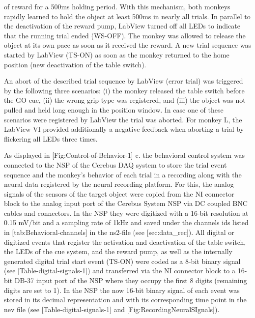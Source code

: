 {of reward for a 500ms holding period. With this mechanism, both monkeys rapidly learned to hold the object at least 500ms in nearly all trials. In parallel to the deactivation of the reward pump, LabView turned off all LEDs to indicate that the running trial ended (WS-OFF). The monkey was allowed to release the object at its own pace as soon as it received the reward. A new trial sequence was started by LabView (TS-ON) as soon as the monkey returned to the home position (new deactivation of the table switch).

An abort of the described trial sequence by LabView (error trial) was triggered by the following three scenarios: (i) the monkey released the table switch before the GO cue, (ii) the wrong grip type was registered, and (iii) the object was not pulled and held long enough in the position window. In case one of these scenarios were registered by LabView the trial was aborted. For monkey L, the LabView VI provided additionally a negative feedback when aborting a trial by flickering all LEDs three times. 

As displayed in [Fig:Control-of-Behavior-1] c. the behavioral control system was connected to the NSP of the Cerebus DAQ system to store the trial event sequence and the monkey's behavior of each trial in a recording along with the neural data registered by the neural recording platform. For this, the analog signals of the sensors of the target object were copied from the NI connector block to the analog input port of the Cerebus System NSP via DC coupled BNC cables and connectors. In the NSP they were digitized with a 16-bit resolution at 0.15 mV/bit and a sampling rate of 1kHz and saved under the channels ids listed in [tab:Behavioral-channels] in the ns2-file (see [sec:data\_rec]). All digital or digitized events that register the activation and deactivation of the table switch, the LEDs of the cue system, and the reward pump, as well as the internally generated digital trial start event (TS-ON) were coded as a 8-bit binary signal (see [Table-digital-signals-1]) and transferred via the NI connector block to a 16-bit DB-37 input port of the NSP where they occupy the first 8 digits (remaining digits are set to 1). In the NSP the now 16-bit binary signal of each event was stored in its decimal representation and with its corresponding time point in the nev file (see [Table-digital-signals-1] and [Fig:RecordingNeuralSIgnals]).

}
